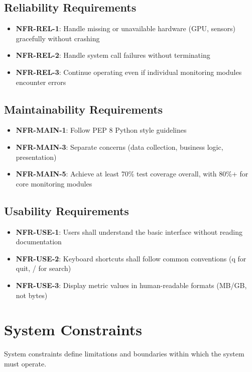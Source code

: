 \documentclass[12pt,a4paper,oneside]{report}
\begin{document}
\subsection{Reliability Requirements}
\begin{itemize}
    \item \textbf{NFR-REL-1}: Handle missing or unavailable hardware (GPU, sensors) gracefully without crashing
    \item \textbf{NFR-REL-2}: Handle system call failures without terminating
    \item \textbf{NFR-REL-3}: Continue operating even if individual monitoring modules encounter errors
\end{itemize}

\subsection{Maintainability Requirements}
\begin{itemize}
    \item \textbf{NFR-MAIN-1}: Follow PEP 8 Python style guidelines
    \item \textbf{NFR-MAIN-3}: Separate concerns (data collection, business logic, presentation)
    \item \textbf{NFR-MAIN-5}: Achieve at least 70\% test coverage overall, with 80\%+ for core monitoring modules
\end{itemize}

\subsection{Usability Requirements}
\begin{itemize}
    \item \textbf{NFR-USE-1}: Users shall understand the basic interface without reading documentation
    \item \textbf{NFR-USE-2}: Keyboard shortcuts shall follow common conventions (q for quit, / for search)
    \item \textbf{NFR-USE-3}: Display metric values in human-readable formats (MB/GB, not bytes)
\end{itemize}

\section{System Constraints}
\label{sec:system-constraints}

System constraints define limitations and boundaries within which the system must operate.
\end{document}
